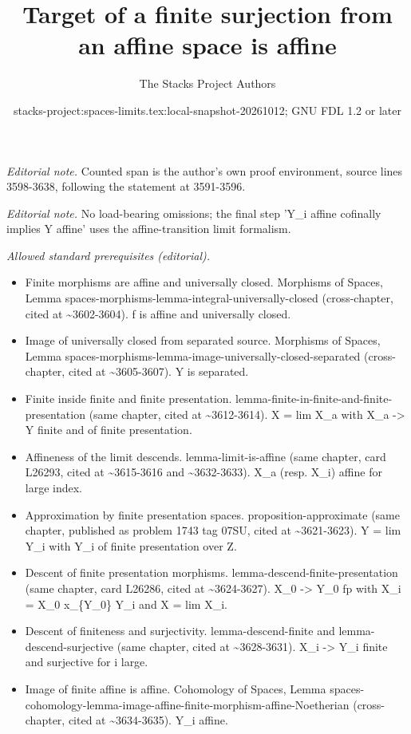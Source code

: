 \documentclass{stacks-project}
\title{Target of a finite surjection from an affine space is affine}
\author{The Stacks Project Authors}
\date{stacks-project:spaces-limits.tex:local-snapshot-20261012; GNU FDL 1.2 or later}
\theoremstyle{plain}
\theoremstyle{definition}
\theoremstyle{remark}
\numberwithin{equation}{subsection}
\begin{document}
\maketitle
\noindent\textit{Editorial note.} Counted span is the author's own proof environment, source lines 3598-3638, following the statement at 3591-3596.\par\medskip
\noindent\textit{Editorial note.} No load-bearing omissions; the final step 'Y\_i affine cofinally implies Y affine' uses the affine-transition limit formalism.\par\medskip
\noindent\textit{Allowed standard prerequisites (editorial).}\begin{itemize}
\item Finite morphisms are affine and universally closed. Morphisms of Spaces, Lemma spaces-morphisms-lemma-integral-universally-closed (cross-chapter, cited at \textasciitilde{}3602-3604). f is affine and universally closed.
\item Image of universally closed from separated source. Morphisms of Spaces, Lemma spaces-morphisms-lemma-image-universally-closed-separated (cross-chapter, cited at \textasciitilde{}3605-3607). Y is separated.
\item Finite inside finite and finite presentation. lemma-finite-in-finite-and-finite-presentation (same chapter, cited at \textasciitilde{}3612-3614). X = lim X\_a with X\_a -> Y finite and of finite presentation.
\item Affineness of the limit descends. lemma-limit-is-affine (same chapter, card L26293, cited at \textasciitilde{}3615-3616 and \textasciitilde{}3632-3633). X\_a (resp. X\_i) affine for large index.
\item Approximation by finite presentation spaces. proposition-approximate (same chapter, published as problem 1743 tag 07SU, cited at \textasciitilde{}3621-3623). Y = lim Y\_i with Y\_i of finite presentation over Z.
\item Descent of finite presentation morphisms. lemma-descend-finite-presentation (same chapter, card L26286, cited at \textasciitilde{}3624-3627). X\_0 -> Y\_0 fp with X\_i = X\_0 x\_\{Y\_0\} Y\_i and X = lim X\_i.
\item Descent of finiteness and surjectivity. lemma-descend-finite and lemma-descend-surjective (same chapter, cited at \textasciitilde{}3628-3631). X\_i -> Y\_i finite and surjective for i large.
\item Image of finite affine is affine. Cohomology of Spaces, Lemma spaces-cohomology-lemma-image-affine-finite-morphism-affine-Noetherian (cross-chapter, cited at \textasciitilde{}3634-3635). Y\_i affine.
\end{itemize}\medskip
\end{document}
